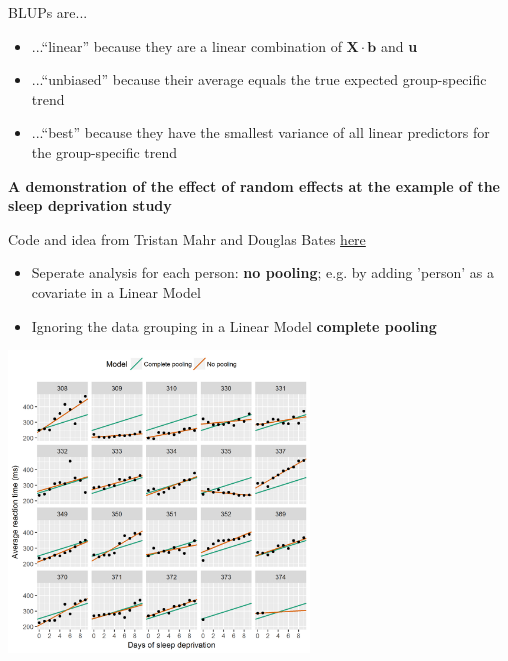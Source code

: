 \documentclass{beamer}
\begin{document}
\begin{frame}{}
\large
BLUPs are...
\vspace{0.2cm}

    \begin{itemize}
        \item ...“linear” because they are a linear combination of $\mathbf{X} \cdot \mathbf{b}$ and \textbf{u}
        \item ...“unbiased” because their average equals the true expected group-specific trend
        \item ...“best” because they have the smallest variance of all linear predictors for the group-specific trend
    \end{itemize}
\end{frame}

\begin{frame}
    \huge
    \textbf{A demonstration of the effect of random effects at the example of the sleep deprivation study}
    \vspace{0.3cm}

    \normalsize
    Code and idea from Tristan Mahr and Douglas Bates \color{blue}\href{https://www.tjmahr.com/plotting-partial-pooling-in-mixed-effects-models/}{here}
\end{frame}

\begin{frame}
\begin{itemize}
    \item Seperate analysis for each person: \textbf{no pooling}; e.g. by adding 'person' as a covariate in a Linear Model
    \item Ignoring the data grouping in a Linear Model \textbf{complete pooling}
\end{itemize}
    \centering
    \includegraphics[width=0.6\textwidth]{lectures/day_5_theory_of_mems/figures/pooling-vs-no-pooling-1.png}
\end{frame}
\end{document}
